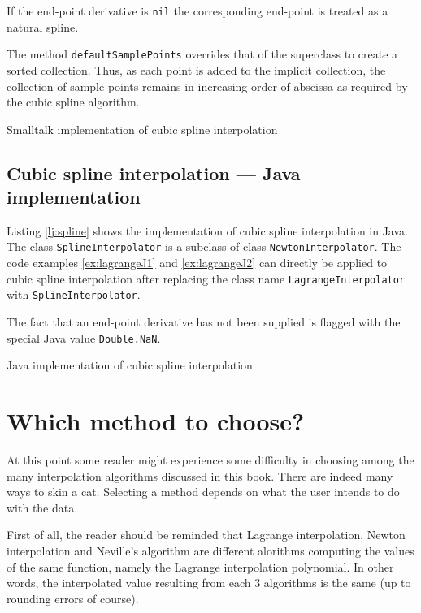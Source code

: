 \documentclass[twoside]{book}
\begin{document}
If the end-point derivative is {\tt nil} the corresponding
end-point is treated as a natural spline.

The method {\tt defaultSamplePoints} overrides that of the
superclass to create a sorted collection. Thus, as each point is
added to the implicit collection, the collection of sample points
remains in increasing order of abscissa as required by the cubic
spline algorithm.

\begin{listing}
  Smalltalk implementation of cubic spline interpolation
  \label{ls:spline}

\end{listing}

\subsection{Cubic spline interpolation --- Java implementation}
Listing \ref{lj:spline} shows the implementation of cubic spline
interpolation in Java. The class {\tt SplineInterpolator} is a
subclass of class {\tt NewtonInterpolator}.  The code examples
\ref{ex:lagrangeJ1} and \ref{ex:lagrangeJ2} can directly be
applied to cubic spline interpolation after replacing the class
name {\tt LagrangeInterpolator} with {\tt SplineInterpolator}.

The fact that an end-point derivative has not been supplied is
flagged with the special Java value {\tt Double.NaN}.


\begin{listing}
  Java implementation of cubic spline
interpolation
\label{lj:spline}

\end{listing}

\section{Which method to choose?}
At this point some reader might experience some difficulty in
choosing among the many interpolation algorithms discussed in this
book. There are indeed many ways to skin a cat. Selecting a method
depends on what the user intends to do with the data.

First of all, the reader should be reminded that Lagrange
interpolation, Newton interpolation and Neville's algorithm are
different alorithms computing the values of the same function,
namely the Lagrange interpolation polynomial. In other words, the
interpolated value resulting from each 3 algorithms is the same
(up to rounding errors of course).
\end{document}
